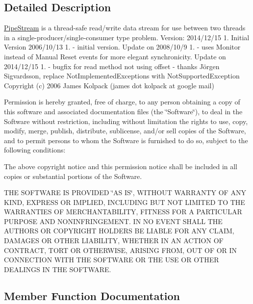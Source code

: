 \subsection{Detailed Description}
\mbox{\hyperlink{class_a_d_l_1_1_pipe_stream}{Pipe\+Stream}} is a thread-\/safe read/write data stream for use between two threads in a single-\/producer/single-\/consumer type problem. Version\+: 2014/12/15 1. Initial Version 2006/10/13 1. -\/ initial version. Update on 2008/10/9 1. -\/ uses Monitor instead of Manual Reset events for more elegant synchronicity. Update on 2014/12/15 1. -\/ bugfix for read method not using offset -\/ thanks Jörgen Sigvardsson, replace Not\+Implemented\+Exceptions with Not\+Supported\+Exception Copyright (c) 2006 James Kolpack (james dot kolpack at google mail) 

Permission is hereby granted, free of charge, to any person obtaining a copy of this software and associated documentation files (the \char`\"{}\+Software\char`\"{}), to deal in the Software without restriction, including without limitation the rights to use, copy, modify, merge, publish, distribute, sublicense, and/or sell copies of the Software, and to permit persons to whom the Software is furnished to do so, subject to the following conditions\+:

The above copyright notice and this permission notice shall be included in all copies or substantial portions of the Software.

T\+HE S\+O\+F\+T\+W\+A\+RE IS P\+R\+O\+V\+I\+D\+ED \char`\"{}\+A\+S I\+S\char`\"{}, W\+I\+T\+H\+O\+UT W\+A\+R\+R\+A\+N\+TY OF A\+NY K\+I\+ND, E\+X\+P\+R\+E\+SS OR I\+M\+P\+L\+I\+ED, I\+N\+C\+L\+U\+D\+I\+NG B\+UT N\+OT L\+I\+M\+I\+T\+ED TO T\+HE W\+A\+R\+R\+A\+N\+T\+I\+ES OF M\+E\+R\+C\+H\+A\+N\+T\+A\+B\+I\+L\+I\+TY, F\+I\+T\+N\+E\+SS F\+OR A P\+A\+R\+T\+I\+C\+U\+L\+AR P\+U\+R\+P\+O\+SE A\+ND N\+O\+N\+I\+N\+F\+R\+I\+N\+G\+E\+M\+E\+NT. IN NO E\+V\+E\+NT S\+H\+A\+LL T\+HE A\+U\+T\+H\+O\+RS OR C\+O\+P\+Y\+R\+I\+G\+HT H\+O\+L\+D\+E\+RS BE L\+I\+A\+B\+LE F\+OR A\+NY C\+L\+A\+IM, D\+A\+M\+A\+G\+ES OR O\+T\+H\+ER L\+I\+A\+B\+I\+L\+I\+TY, W\+H\+E\+T\+H\+ER IN AN A\+C\+T\+I\+ON OF C\+O\+N\+T\+R\+A\+CT, T\+O\+RT OR O\+T\+H\+E\+R\+W\+I\+SE, A\+R\+I\+S\+I\+NG F\+R\+OM, O\+UT OF OR IN C\+O\+N\+N\+E\+C\+T\+I\+ON W\+I\+TH T\+HE S\+O\+F\+T\+W\+A\+RE OR T\+HE U\+SE OR O\+T\+H\+ER D\+E\+A\+L\+I\+N\+GS IN T\+HE S\+O\+F\+T\+W\+A\+RE. 

\subsection{Member Function Documentation}
\mbox{\label{class_a_d_l_1_1_pipe_stream_a430dca29f0cd1ff4a27fc7bcafbe7a8f}} 
